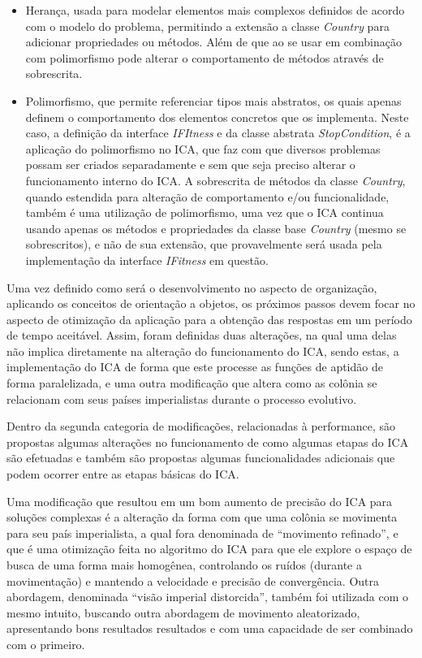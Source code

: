 \begin{itemize}
\item Herança, usada para modelar elementos mais complexos definidos de acordo com o modelo do problema, permitindo a extensão a classe \emph{Country} para adicionar propriedades ou métodos. Além de que ao se usar em combinação com polimorfismo pode alterar o comportamento de métodos através de sobrescrita.

\item Polimorfismo, que permite referenciar tipos mais abstratos, os quais apenas definem o comportamento dos elementos concretos que os implementa. Neste caso, a definição da interface \emph{IFItness} e da classe abstrata \emph{StopCondition}, é a aplicação do polimorfismo no ICA, que faz com que diversos problemas possam ser criados separadamente e sem que seja preciso alterar o funcionamento interno do  ICA.
A sobrescrita de métodos da classe \emph{Country}, quando estendida para alteração de comportamento e/ou funcionalidade, também é uma utilização de polimorfismo, uma vez que o ICA continua usando apenas os métodos e propriedades da classe base \emph{Country} (mesmo se sobrescritos), e não de sua extensão, que provavelmente será usada pela implementação da interface \emph{IFitness} em questão.
\end{itemize}

Uma vez definido como será o desenvolvimento no aspecto de organização, aplicando os conceitos de orientação a objetos, os próximos passos devem focar no aspecto de otimização da aplicação para a obtenção das respostas em um período de tempo aceitável. Assim, foram definidas duas alterações, na qual uma delas não implica diretamente na alteração do funcionamento do ICA, sendo estas, a implementação do ICA de forma que este processe as funções de aptidão de forma paralelizada, e uma outra modificação que altera como as colônia se relacionam com seus países imperialistas durante o processo evolutivo.

Dentro da segunda categoria de  modificações, relacionadas à performance, são propostas algumas alterações no funcionamento de como algumas etapas do ICA são efetuadas e também são propostas algumas funcionalidades adicionais que podem ocorrer entre as etapas básicas do ICA.

Uma modificação que resultou em um bom aumento de precisão do ICA para soluções complexas é a alteração da forma com que uma colônia se movimenta para seu país imperialista, a qual fora denominada de “movimento refinado”, e que é uma otimização feita no algoritmo do ICA para que ele explore o espaço de busca de uma forma mais homogênea, controlando os ruídos (durante a movimentação) e mantendo a velocidade e precisão de convergência. Outra abordagem, denominada “visão imperial distorcida”, também foi utilizada com o mesmo intuito, buscando outra abordagem de movimento aleatorizado, apresentando bons resultados resultados e com uma capacidade de ser combinado com o primeiro.

